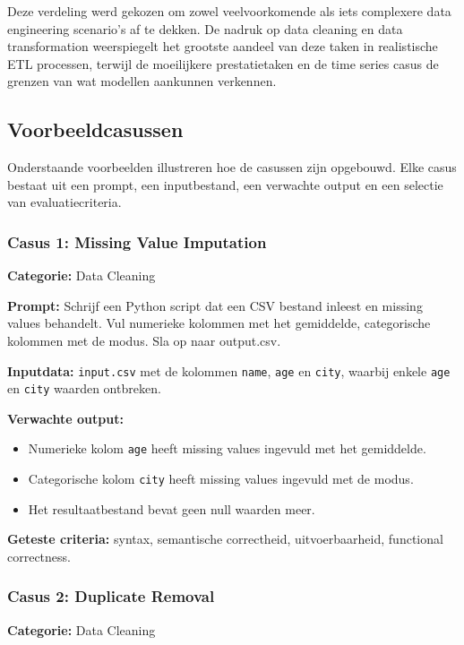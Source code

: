 Deze verdeling werd gekozen om zowel veelvoorkomende als iets complexere data engineering scenario's af te dekken. De nadruk op data cleaning en data transformation weerspiegelt het grootste aandeel van deze taken in realistische ETL processen, terwijl de moeilijkere prestatietaken en de time series casus de grenzen van wat modellen aankunnen verkennen.

\subsection{Voorbeeldcasussen}

Onderstaande voorbeelden illustreren hoe de casussen zijn opgebouwd. Elke casus bestaat uit een prompt, een inputbestand, een verwachte output en een selectie van evaluatiecriteria.

\subsubsection*{Casus 1: Missing Value Imputation}

\textbf{Categorie:} Data Cleaning

\textbf{Prompt:} Schrijf een Python script dat een CSV bestand inleest en missing values behandelt. Vul numerieke kolommen met het gemiddelde, categorische kolommen met de modus. Sla op naar output.csv.

\textbf{Inputdata:} \texttt{input.csv} met de kolommen \texttt{name}, \texttt{age} en \texttt{city}, waarbij enkele \texttt{age} en \texttt{city} waarden ontbreken.

\textbf{Verwachte output:}
\begin{itemize}
    \item Numerieke kolom \texttt{age} heeft missing values ingevuld met het gemiddelde.
    \item Categorische kolom \texttt{city} heeft missing values ingevuld met de modus.
    \item Het resultaatbestand bevat geen null waarden meer.
\end{itemize}

\textbf{Geteste criteria:} syntax, semantische correctheid, uitvoerbaarheid, functional correctness.

\subsubsection*{Casus 2: Duplicate Removal}

\textbf{Categorie:} Data Cleaning

